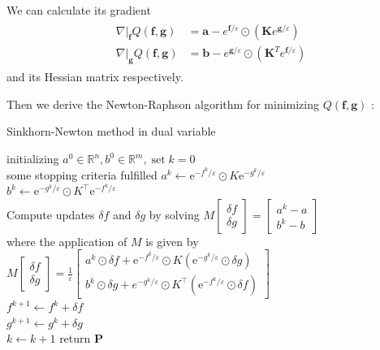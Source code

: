 \documentclass{article}
\begin{document}
We can calculate its gradient
\begin{align}
\begin{aligned} 
\left. \nabla \right| _ { \mathbf { f } } Q ( \mathbf { f } , \mathbf { g } ) & = \mathbf { a } - e ^ { \mathbf { f } / \varepsilon } \odot \left( \mathbf { K } e ^ { \mathbf { g } / \varepsilon } \right) \\
 \left. \nabla \right| _ { \mathbf { g } } Q ( \mathbf { f } , \mathbf { g } ) & = \mathbf { b } - e ^ { \mathbf { g } / \varepsilon } \odot \left( \mathbf { K } ^ { T } e ^ { \mathbf { f } / \varepsilon } \right) \end{aligned}
 \label{Q_grad}
\end{align}
and its Hessian matrix respectively.
 
Then we derive the Newton-Raphson algorithm for minimizing $ Q ( \mathbf { f } , \mathbf { g } )$ :

\begin{algorithm}[H]
  \SetAlgoNoLine
  \caption{Sinkhorn-Newton method in dual variable} 
  initializing $a ^ { 0 } \in \mathbb { R } ^ { n } , b ^ { 0 } \in \mathbb { R } ^ { m } , \operatorname { set } k = 0$\\
  \Repeat
  { some stopping criteria fulfilled }{
 $a ^ { k }\gets  \mathrm { e } ^ { - f ^ { k } / \varepsilon } \odot K \mathrm { e } ^ { - g ^ { k } / \varepsilon }$\\
 $b ^ { k } \gets  \mathrm { e } ^ { - g ^ { k } / \varepsilon } \odot K ^ { \top } \mathrm { e } ^ { - f ^ { k } / \varepsilon }$\\
 Compute updates $\delta f$ and $\delta g$ by solving
$M \left[ \begin{array} { c } { \delta f } \\ { \delta g } \end{array} \right] = \left[ \begin{array} { c } { a ^ { k } - a } \\ { b ^ { k } - b } \end{array} \right]$\\
   where the application of $M$ is given by
$M \left[ \begin{array} { c } { \delta f } \\ { \delta g } \end{array} \right] = \frac { 1 } { \varepsilon } \left[ \begin{array} { c } { a ^ { k } \odot \delta f + \mathrm { e } ^ { - f ^ { k } / \varepsilon } \odot K \left( \mathrm { e } ^ { - g ^ { k } / \varepsilon } \odot \delta g \right) } \\ { b ^ { k } \odot \delta g + e ^ { - g ^ { k } / \varepsilon } \odot K ^ { \top } \left( \mathrm { e } ^ { - f ^ { k } / \varepsilon } \odot \delta f \right) } \end{array} \right]$\\
$f ^ { k + 1 } \gets f ^ { k } + \delta f$\\
$g ^ { k + 1 } \gets  g ^ { k } + \delta g$\\
$k\gets k+1$
  }
  return $\mathbf{P}$
\end{algorithm}
\end{document}
